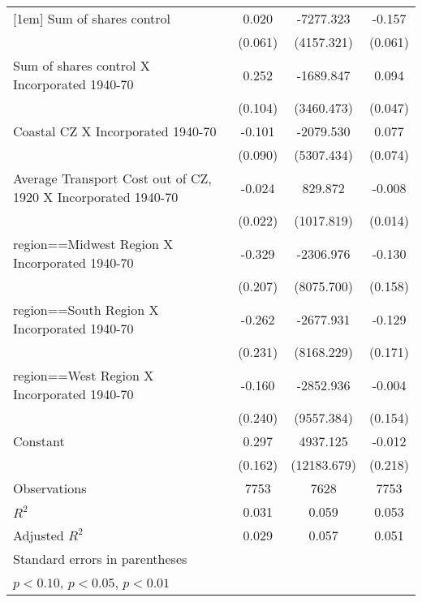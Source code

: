 \begin{table}[htbp]
\begin{tabular}{l*{3}{c}}
[1em]
Sum of shares control&       0.020         &   -7277.323\sym{*}  &      -0.157\sym{**} \\
                    &     (0.061)         &  (4157.321)         &     (0.061)         \\
[1em]
Sum of shares control X Incorporated 1940-70&       0.252\sym{**} &   -1689.847         &       0.094\sym{**} \\
                    &     (0.104)         &  (3460.473)         &     (0.047)         \\
[1em]
Coastal CZ X Incorporated 1940-70&      -0.101         &   -2079.530         &       0.077         \\
                    &     (0.090)         &  (5307.434)         &     (0.074)         \\
[1em]
Average Transport Cost out of CZ, 1920 X Incorporated 1940-70&      -0.024         &     829.872         &      -0.008         \\
                    &     (0.022)         &  (1017.819)         &     (0.014)         \\
[1em]
region==Midwest Region X Incorporated 1940-70&      -0.329         &   -2306.976         &      -0.130         \\
                    &     (0.207)         &  (8075.700)         &     (0.158)         \\
[1em]
region==South Region X Incorporated 1940-70&      -0.262         &   -2677.931         &      -0.129         \\
                    &     (0.231)         &  (8168.229)         &     (0.171)         \\
[1em]
region==West Region X Incorporated 1940-70&      -0.160         &   -2852.936         &      -0.004         \\
                    &     (0.240)         &  (9557.384)         &     (0.154)         \\
[1em]
Constant            &       0.297\sym{*}  &    4937.125         &      -0.012         \\
                    &     (0.162)         & (12183.679)         &     (0.218)         \\
\hline
Observations        &        7753         &        7628         &        7753         \\
\(R^{2}\)           &       0.031         &       0.059         &       0.053         \\
Adjusted \(R^{2}\)  &       0.029         &       0.057         &       0.051         \\
\hline\hline
\multicolumn{4}{l}{\footnotesize Standard errors in parentheses}\\
\multicolumn{4}{l}{\footnotesize \sym{*} \(p<0.10\), \sym{**} \(p<0.05\), \sym{***} \(p<0.01\)}\\
\end{tabular}
\end{table}
